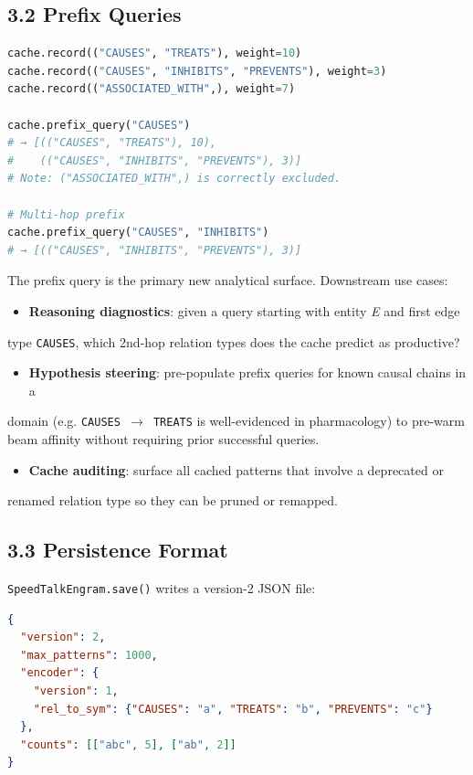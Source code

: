 \subsection*{3.2 Prefix Queries}

\begin{lstlisting}[language=Python]
cache.record(("CAUSES", "TREATS"), weight=10)
cache.record(("CAUSES", "INHIBITS", "PREVENTS"), weight=3)
cache.record(("ASSOCIATED_WITH",), weight=7)

cache.prefix_query("CAUSES")
# → [(("CAUSES", "TREATS"), 10),
#    (("CAUSES", "INHIBITS", "PREVENTS"), 3)]
# Note: ("ASSOCIATED_WITH",) is correctly excluded.

# Multi-hop prefix
cache.prefix_query("CAUSES", "INHIBITS")
# → [(("CAUSES", "INHIBITS", "PREVENTS"), 3)]
\end{lstlisting}

The prefix query is the primary new analytical surface.  Downstream use cases:
\begin{itemize}
  \item \textbf{Reasoning diagnostics}: given a query starting with entity \textit{E} and first edge
\end{itemize}

type \texttt{CAUSES}, which 2nd-hop relation types does the cache predict as productive?
\begin{itemize}
  \item \textbf{Hypothesis steering}: pre-populate prefix queries for known causal chains in a
\end{itemize}

domain (e.g. \texttt{CAUSES $\to$ TREATS} is well-evidenced in pharmacology) to pre-warm
beam affinity without requiring prior successful queries.
\begin{itemize}
  \item \textbf{Cache auditing}: surface all cached patterns that involve a deprecated or
\end{itemize}

renamed relation type so they can be pruned or remapped.

\subsection*{3.3 Persistence Format}

\texttt{SpeedTalkEngram.save()} writes a version-2 JSON file:

\begin{lstlisting}[language=Json]
{
  "version": 2,
  "max_patterns": 1000,
  "encoder": {
    "version": 1,
    "rel_to_sym": {"CAUSES": "a", "TREATS": "b", "PREVENTS": "c"}
  },
  "counts": [["abc", 5], ["ab", 2]]
}
\end{lstlisting}

